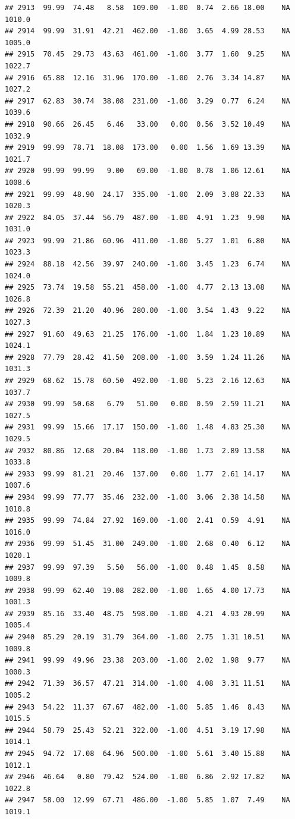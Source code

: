 \documentclass{article}\usepackage{graphicx, color}
\makeatletter
\newenvironment{kframe}{%
 \def\at@end@of@kframe{}%
 \ifinner\ifhmode%
  \def\at@end@of@kframe{\end{minipage}}%
  \begin{minipage}{\columnwidth}%
 \fi\fi%
 \def\FrameCommand##1{\hskip\@totalleftmargin \hskip-\fboxsep
 \colorbox{shadecolor}{##1}\hskip-\fboxsep
     \hskip-\linewidth \hskip-\@totalleftmargin \hskip\columnwidth}%
 \MakeFramed {\advance\hsize-\width
   \@totalleftmargin\z@ \linewidth\hsize
   \@setminipage}}%
 {\par\unskip\endMakeFramed%
 \at@end@of@kframe}
\newenvironment{knitrout}{}{} %
\makeatother
\begin{document}
\begin{knitrout}
\begin{kframe}
\begin{verbatim}
## 2913  99.99  74.48   8.58  109.00  -1.00  0.74  2.66 18.00    NA 1010.0
## 2914  99.99  31.91  42.21  462.00  -1.00  3.65  4.99 28.53    NA 1005.0
## 2915  70.45  29.73  43.63  461.00  -1.00  3.77  1.60  9.25    NA 1022.7
## 2916  65.88  12.16  31.96  170.00  -1.00  2.76  3.34 14.87    NA 1027.2
## 2917  62.83  30.74  38.08  231.00  -1.00  3.29  0.77  6.24    NA 1039.6
## 2918  90.66  26.45   6.46   33.00   0.00  0.56  3.52 10.49    NA 1032.9
## 2919  99.99  78.71  18.08  173.00   0.00  1.56  1.69 13.39    NA 1021.7
## 2920  99.99  99.99   9.00   69.00  -1.00  0.78  1.06 12.61    NA 1008.6
## 2921  99.99  48.90  24.17  335.00  -1.00  2.09  3.88 22.33    NA 1020.3
## 2922  84.05  37.44  56.79  487.00  -1.00  4.91  1.23  9.90    NA 1031.0
## 2923  99.99  21.86  60.96  411.00  -1.00  5.27  1.01  6.80    NA 1023.3
## 2924  88.18  42.56  39.97  240.00  -1.00  3.45  1.23  6.74    NA 1024.0
## 2925  73.74  19.58  55.21  458.00  -1.00  4.77  2.13 13.08    NA 1026.8
## 2926  72.39  21.20  40.96  280.00  -1.00  3.54  1.43  9.22    NA 1027.3
## 2927  91.60  49.63  21.25  176.00  -1.00  1.84  1.23 10.89    NA 1024.1
## 2928  77.79  28.42  41.50  208.00  -1.00  3.59  1.24 11.26    NA 1031.3
## 2929  68.62  15.78  60.50  492.00  -1.00  5.23  2.16 12.63    NA 1037.7
## 2930  99.99  50.68   6.79   51.00   0.00  0.59  2.59 11.21    NA 1027.5
## 2931  99.99  15.66  17.17  150.00  -1.00  1.48  4.83 25.30    NA 1029.5
## 2932  80.86  12.68  20.04  118.00  -1.00  1.73  2.89 13.58    NA 1033.8
## 2933  99.99  81.21  20.46  137.00   0.00  1.77  2.61 14.17    NA 1007.6
## 2934  99.99  77.77  35.46  232.00  -1.00  3.06  2.38 14.58    NA 1010.8
## 2935  99.99  74.84  27.92  169.00  -1.00  2.41  0.59  4.91    NA 1016.0
## 2936  99.99  51.45  31.00  249.00  -1.00  2.68  0.40  6.12    NA 1020.1
## 2937  99.99  97.39   5.50   56.00  -1.00  0.48  1.45  8.58    NA 1009.8
## 2938  99.99  62.40  19.08  282.00  -1.00  1.65  4.00 17.73    NA 1001.3
## 2939  85.16  33.40  48.75  598.00  -1.00  4.21  4.93 20.99    NA 1005.4
## 2940  85.29  20.19  31.79  364.00  -1.00  2.75  1.31 10.51    NA 1009.8
## 2941  99.99  49.96  23.38  203.00  -1.00  2.02  1.98  9.77    NA 1000.3
## 2942  71.39  36.57  47.21  314.00  -1.00  4.08  3.31 11.51    NA 1005.2
## 2943  54.22  11.37  67.67  482.00  -1.00  5.85  1.46  8.43    NA 1015.5
## 2944  58.79  25.43  52.21  322.00  -1.00  4.51  3.19 17.98    NA 1014.1
## 2945  94.72  17.08  64.96  500.00  -1.00  5.61  3.40 15.88    NA 1012.1
## 2946  46.64   0.80  79.42  524.00  -1.00  6.86  2.92 17.82    NA 1022.8
## 2947  58.00  12.99  67.71  486.00  -1.00  5.85  1.07  7.49    NA 1019.1

\end{verbatim}
\end{kframe}
\end{knitrout}
\end{document}
